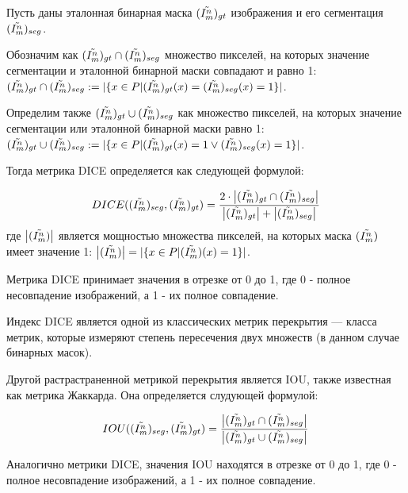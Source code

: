 Пусть даны эталонная бинарная маска \((\tilde{I^n_m})_{gt}\) изображения и его сегментация \((\tilde{I^n_m})_{seg}\).

Обозначим как \((\tilde{I^n_m})_{gt} \cap (\tilde{I^n_m})_{seg}\) множество пикселей, на которых значение сегментации и эталонной бинарной маски совпадают и равно 1: \((\tilde{I^n_m})_{gt} \cap (\tilde{I^n_m})_{seg} := |\{x \in P | (\tilde{I^n_m})_{gt}(x) = (\tilde{I^n_m})_{seg}(x) = 1 \}|\).

Определим также \((\tilde{I^n_m})_{gt} \cup (\tilde{I^n_m})_{seg}\) как множество пикселей, на которых значение сегментации или эталонной бинарной маски  равно 1: \((\tilde{I^n_m})_{gt} \cup (\tilde{I^n_m})_{seg} := |\{x \in P | (\tilde{I^n_m})_{gt}(x) = 1 \lor (\tilde{I^n_m})_{seg}(x) = 1 \}|\).

Тогда метрика DICE определяется как следующей формулой:

\begin{equation}\label{eq:DICE}
    DICE((\tilde{I^n_m})_{seg}, (\tilde{I^n_m})_{gt}) =
    \frac{2 \cdot \left|(\tilde{I^n_m})_{gt} \cap (\tilde{I^n_m})_{seg}\right|}
         {\left|(\tilde{I^n_m})_{gt}\right| + \left|(\tilde{I^n_m})_{seg}\right|}
\end{equation}
где \(\left|(\tilde{I^n_m})\right|\) является мощностью множества пикселей, на которых  маска \((\tilde{I^n_m})\) имеет значение 1: \(\left|(\tilde{I^n_m})\right| = |\{x \in P | (\tilde{I^n_m})(x) = 1 \}|\).

Метрика DICE принимает значения в отрезке от 0 до 1, где 0 - полное несовпадение изображений, а 1 - их полное совпадение.

Индекс DICE является одной из классических метрик перекрытия — класса метрик, которые измеряют степень пересечения двух множеств (в данном случае бинарных масок). 

Другой растрастраненной метрикой перекрытия является IOU, также известная как метрика Жаккарда. Она определяется слудующей формулой:

\begin{equation}\label{eq:IOU}
    IOU((\tilde{I^n_m})_{seg}, (\tilde{I^n_m})_{gt}) =
    \frac{\left|(\tilde{I^n_m})_{gt} \cap (\tilde{I^n_m})_{seg}\right|}
         {\left|(\tilde{I^n_m})_{gt} \cup (\tilde{I^n_m})_{seg}\right|}
\end{equation}

Аналогично метрики DICE, значения IOU находятся в отрезке от 0 до 1, где 0 - полное несовпадение изображений, а 1 - их полное совпадение.

